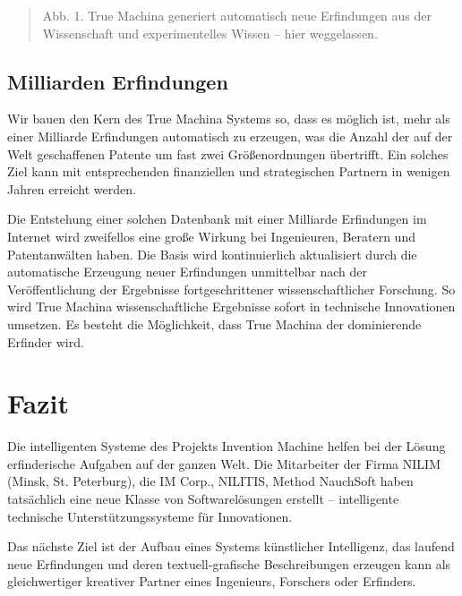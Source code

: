\documentclass[11pt,a4paper]{article}
\begin{document}
\begin{quote}
  Abb. 1. True Machina generiert automatisch neue Erfindungen aus der
  Wissenschaft und experimentelles Wissen -- hier weggelassen.
\end{quote}

\subsection{Milliarden Erfindungen}

Wir bauen den Kern des True Machina Systems so, dass es möglich ist, mehr als
einer Milliarde Erfindungen automatisch zu erzeugen, was die Anzahl der auf
der Welt geschaffenen Patente um fast zwei Größenordnungen übertrifft. Ein
solches Ziel kann mit entsprechenden finanziellen und strategischen Partnern
in wenigen Jahren erreicht werden.

Die Entstehung einer solchen Datenbank mit einer Milliarde Erfindungen im
Internet wird zweifellos eine große Wirkung bei Ingenieuren, Beratern und
Patentanwälten haben. Die Basis wird kontinuierlich aktualisiert durch die
automatische Erzeugung neuer Erfindungen unmittelbar nach der Veröffentlichung
der Ergebnisse fortgeschrittener wissenschaftlicher Forschung. So wird True
Machina wissenschaftliche Ergebnisse sofort in technische Innovationen
umsetzen.  Es besteht die Möglichkeit, dass True Machina der dominierende
Erfinder wird.

\section{Fazit}

Die intelligenten Systeme des Projekts Invention Machine helfen bei der Lösung
erfinderische Aufgaben auf der ganzen Welt. Die Mitarbeiter der Firma NILIM
(Minsk, St. Peterburg), die IM Corp., NILITIS, Method NauchSoft haben
tatsächlich eine neue Klasse von Softwarelösungen erstellt -- intelligente
technische Unterstützungssysteme für Innovationen.

Das nächste Ziel ist der Aufbau eines Systems künstlicher Intelligenz, das
laufend neue Erfindungen und deren textuell-grafische Beschreibungen erzeugen
kann als gleichwertiger kreativer Partner eines Ingenieurs, Forschers oder
Erfinders.
\end{document}
